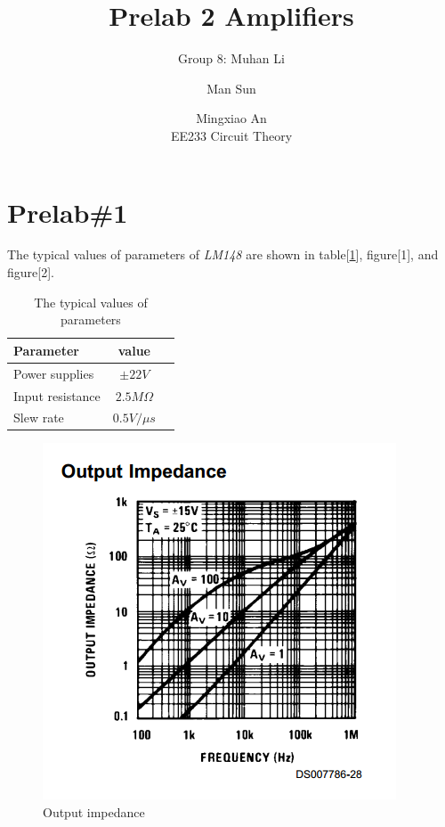 \documentclass{IEEEtran}
\title{Prelab 2 Amplifiers}
\author{Group 8: Muhan Li \and Man Sun \and Mingxiao An \\ EE233 Circuit Theory}
\begin{document}
	
	\maketitle
	
	\section{\textbf{Prelab\#1}}
	The typical values of parameters of \textit{LM148} are shown in table[\ref{tab:pl1}], figure[1], and figure[2].
	
	\begin{table}[!htbp]
		\centering
		\caption{The typical values of parameters}
		\begin{tabular}{lcl}
			\toprule
			Parameter & value & \\
			\midrule
			Power supplies & $\pm22\si{V}$ & \\
			Input resistance & $2.5\si{M\Omega}$ & \\
			Slew rate & $0.5\si{V/\mu s}$ & \\
			\bottomrule
		\end{tabular}
		\label{tab:pl1}
	\end{table}
	
	\begin{figure}[!htbp]
		\centering
		\label{fig:101}
		\begin{framed}
			\includegraphics[width=\linewidth]{images/1_1.PNG}
			\caption{Output impedance}
		\end{framed}
	\end{figure}
	
\end{document}
